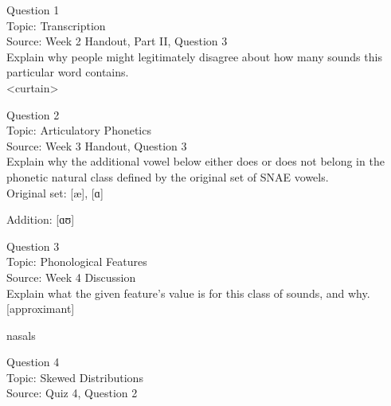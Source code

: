 \documentclass[12pt]{article}
\begin{document}
\begin{center}
\textbf{{\color{blue}{\HUGE START OF EXAM\\}}}

\textbf{{\color{blue}{\HUGE Student ID: 60467\\}}}

\textbf{{\color{blue}{\HUGE \\}}}

\end{center}
\newpage

{\large Question 1}\\

Topic: Transcription\\
Source: Week 2 Handout, Part II, Question 3\\

Explain why people might legitimately disagree about how many sounds this particular word contains.\\

<curtain>


\newpage

{\large Question 2}\\

Topic: Articulatory Phonetics\\
Source: Week 3 Handout, Question 3\\

Explain why the additional vowel below either does or does not belong in the phonetic natural class defined by the original set of SNAE vowels.\\

Original set: {[æ]}, {[ɑ]}

Addition: {[ɑʊ]}


\newpage

{\large Question 3}\\

Topic: Phonological Features\\
Source: Week 4 Discussion\\

Explain what the given feature’s value is for this class of sounds, and why.\\

{[approximant]}

nasals


\newpage

{\large Question 4}\\

Topic: Skewed Distributions\\
Source: Quiz 4, Question 2\\
\end{document}
